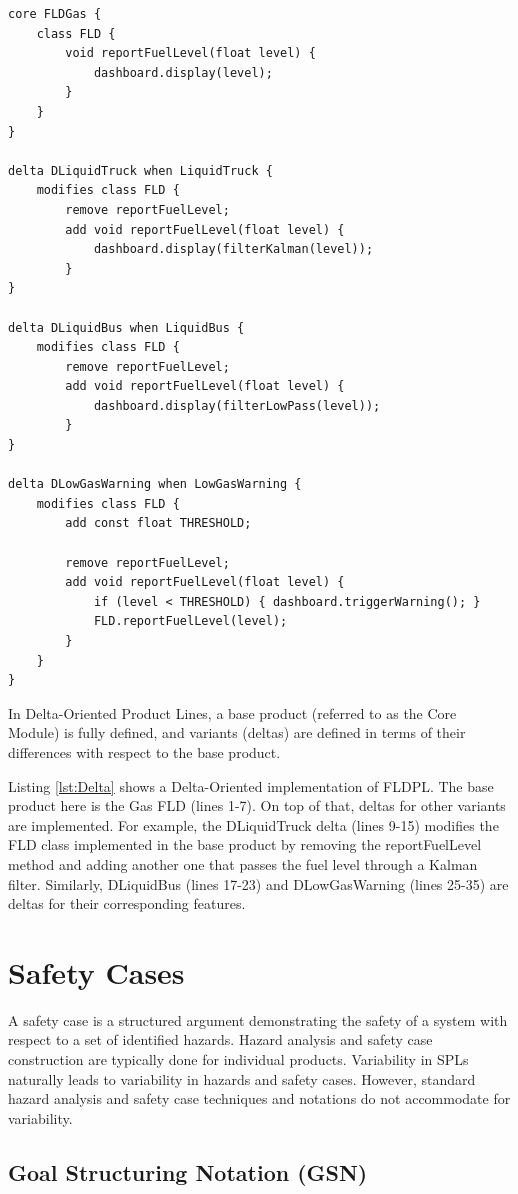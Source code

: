 \documentclass[11pt]{article}
\begin{document}
\begin{lstlisting}[caption=Delta-Oriented FLDPL, label={lst:Delta}, float]
core FLDGas {
	class FLD {
		void reportFuelLevel(float level) { 
			dashboard.display(level); 
		}
	} 
}

delta DLiquidTruck when LiquidTruck {
	modifies class FLD {
		remove reportFuelLevel;
		add void reportFuelLevel(float level) { 
			dashboard.display(filterKalman(level)); 
		}
}

delta DLiquidBus when LiquidBus {
	modifies class FLD {
		remove reportFuelLevel;
		add void reportFuelLevel(float level) { 
			dashboard.display(filterLowPass(level)); 
		}
}

delta DLowGasWarning when LowGasWarning {
	modifies class FLD {
		add const float THRESHOLD;

		remove reportFuelLevel;
		add void reportFuelLevel(float level) {
			if (level < THRESHOLD) { dashboard.triggerWarning(); }
			FLD.reportFuelLevel(level);
		}
	}
}
\end{lstlisting}

In Delta-Oriented \cite{Schaefer} Product Lines, a base product (referred to as the Core Module) is fully defined, and variants (deltas) are defined in terms of their differences with respect to the base product. 

Listing \ref{lst:Delta} shows a Delta-Oriented implementation of FLDPL. The base product here is the Gas FLD (lines 1-7). On top of that, deltas for other variants are implemented. For example, the DLiquidTruck delta (lines 9-15) modifies the FLD class implemented in the base product by removing the reportFuelLevel method and adding another one that passes the fuel level through a Kalman filter. Similarly, DLiquidBus (lines 17-23) and DLowGasWarning (lines 25-35) are deltas for their corresponding features.
 
\section{Safety Cases}

A safety case is a structured argument demonstrating the safety of a system with respect to a set of identified hazards. Hazard analysis and safety case construction are typically done for individual products. Variability in SPLs naturally leads to variability in hazards and safety cases. However, standard hazard analysis and safety case techniques and notations do not accommodate for variability. 
 
\subsection{Goal Structuring Notation (GSN)}
\end{document}
